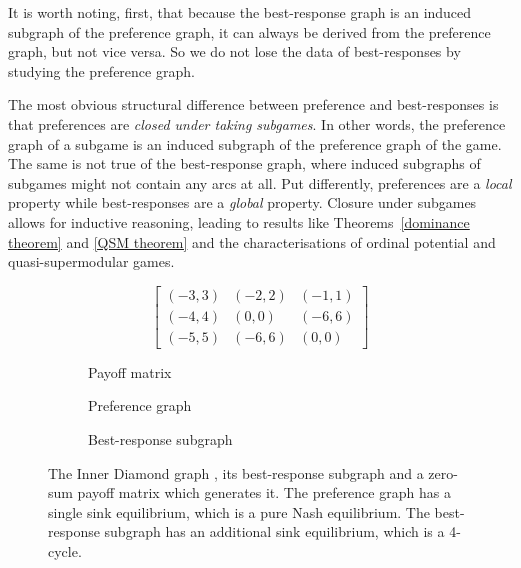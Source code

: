 \documentclass[preprint,authoryear]{elsarticle}
\begin{document}
It is worth noting, first, that because the best-response graph is an induced subgraph of the preference graph, it can always be derived from the preference graph, but not vice versa. So we do not lose the data of best-responses by studying the preference graph.

The most obvious structural difference between preference and best-responses is that preferences are \emph{closed under taking subgames}. In other words, the preference graph of a subgame is an induced subgraph of the preference graph of the game. The same is not true of the best-response graph, where induced subgraphs of subgames might not contain any arcs at all. Put differently, preferences are a \emph{local} property while best-responses are a \emph{global} property. Closure under subgames allows for inductive reasoning, leading to results like Theorems~\ref{dominance theorem} \citep{biggar_graph_2023} and \ref{QSM theorem} \citep{milgrom_rationalizability_1990} and the characterisations of ordinal potential and quasi-supermodular games.

\begin{figure}
    \centering
    \begin{subfigure}{.35\textwidth}
        \centering
        \begin{equation*}
            \begin{bmatrix}
                (-3,3) & (-2,2) & (-1,1) \\
                (-4,4) & (0,0) & (-6,6) \\
                (-5,5) & (-6,6) & (0,0)
            \end{bmatrix}
        \end{equation*}
        \caption{Payoff matrix}
        \label{fig:ID generator}
    \end{subfigure}
    \begin{subfigure}{.3\textwidth}
        \centering
        
        \caption{Preference graph}
        \label{fig:ID}
    \end{subfigure}
    \begin{subfigure}{.3\textwidth}
        \centering
        
        \caption{Best-response subgraph}
        \label{fig:ID best response}
    \end{subfigure}
    \caption{The Inner Diamond graph \citep{biggar_graph_2023}, its best-response subgraph and a zero-sum payoff matrix which generates it. The preference graph has a single sink equilibrium, which is a pure Nash equilibrium. The best-response subgraph has an additional sink equilibrium, which is a 4-cycle.}
    \label{fig:inner diamond and BR}
\end{figure}
\end{document}
